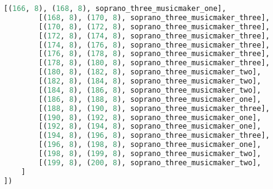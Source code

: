 \begin{lstlisting}[language=Python, caption=Invocation Source Code]
        [(166, 8), (168, 8), soprano_three_musicmaker_one],
        [(168, 8), (170, 8), soprano_three_musicmaker_three],
        [(170, 8), (172, 8), soprano_three_musicmaker_three],
        [(172, 8), (174, 8), soprano_three_musicmaker_three],
        [(174, 8), (176, 8), soprano_three_musicmaker_three],
        [(176, 8), (178, 8), soprano_three_musicmaker_three],
        [(178, 8), (180, 8), soprano_three_musicmaker_three],
        [(180, 8), (182, 8), soprano_three_musicmaker_two],
        [(182, 8), (184, 8), soprano_three_musicmaker_two],
        [(184, 8), (186, 8), soprano_three_musicmaker_two],
        [(186, 8), (188, 8), soprano_three_musicmaker_one],
        [(188, 8), (190, 8), soprano_three_musicmaker_three],
        [(190, 8), (192, 8), soprano_three_musicmaker_one],
        [(192, 8), (194, 8), soprano_three_musicmaker_one],
        [(194, 8), (196, 8), soprano_three_musicmaker_three],
        [(196, 8), (198, 8), soprano_three_musicmaker_one],
        [(198, 8), (199, 8), soprano_three_musicmaker_two],
        [(199, 8), (200, 8), soprano_three_musicmaker_two],
    ]
])


\end{lstlisting}
